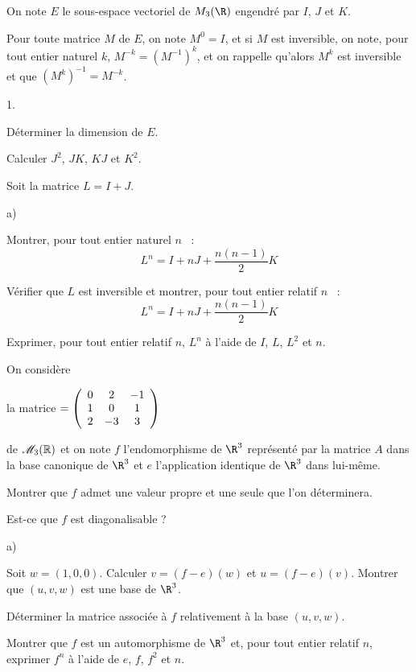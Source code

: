 \documentclass[11pt]{article}%
\begin{document}
On note $E$ le sous-espace vectoriel de $M_{3}(\R)$ engendré par
$I$, $J$ et $K$.

Pour toute matrice $M$ de $E$, on note $M^{0} = I$, et si $M$ est
inversible, on
note, pour tout entier naturel $k$, $M^{-k} = (M^{-1})^{k}$, et on
rappelle
qu'alors $M^{k}$ est inversible et que $(M^{k})^{-1} = M^{-k}$.

\begin{noliste}{1.}
 \setlength{\itemsep}{4mm}
\item Déterminer la dimension de $E$.

\item Calculer $J^{2}$, $JK$, $KJ$ et $K^{2}$.

\item Soit la matrice $L = I + J$.

\begin{noliste}{a)}
 \setlength{\itemsep}{2mm}
\item Montrer, pour tout entier naturel $n$~ :
\[
L^{n} = I + nJ + {\frac{n(n-1)}{2}}K
\]


\item Vérifier que $L$ est inversible et montrer, pour tout entier
relatif
$n$~ :
\[
L^{n} = I + nJ + {\frac{n(n-1)}{2}}K
\]


\item Exprimer, pour tout entier relatif $n$, $L^{n}$ à l'aide de $I$,
$L
$, $L^{2}$ et $n$.
\end{noliste}

On considère

la matrice $ = \left(
\begin{array}
[c]{ccc}0 & 2 & -1\\
1 & 0 & 1\\
2 & -3 & 3
\end{array}
\right) $

de $\mathscr{M}_{3}(\mathbb{R})$ et on note $f$ l'endomorphisme de
$\R^{3}$ représenté par la matrice $A$ dans la base canonique
de $\R^{3}$ et $e$ l'application identique de $\R^{3}$ dans lui-même.

\item Montrer que $f$ admet une valeur propre et une seule que l'on
déterminera.

Est-ce que $f$ est diagonalisable ?

\item
\begin{noliste}{a)}
 \setlength{\itemsep}{2mm}
\item Soit $w = (1,0,0)$. Calculer $v = (f-e)(w)$ et $u = (f-e)(v)$.
Montrer que
$(u,v,w)$ est une base de $\R^{3}$.

\item Déterminer la matrice associée à $f$ relativement à la
base $(u,v,w)$.

\item Montrer que $f$ est un automorphisme de $\R^{3}$ et, pour tout
entier relatif $n$, exprimer $f^{n}$ à l'aide de $e$, $f$, $f^{2}$ et
$n$.
\end{noliste}
\end{noliste}
\end{document}
